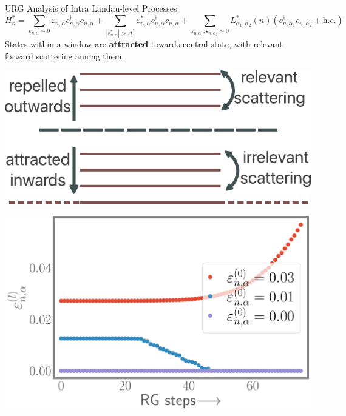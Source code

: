 \documentclass[11pt,aspectratio=169]{beamer}
\newcommand\focus[1]{%
	{\alert{\textbf{#1}}}
}
\begin{document}
\begin{frame}{URG Analysis of Intra Landau-level Processes}
\[
	H_n^* = \sum_{\varepsilon_{n,\alpha} \sim 0}\varepsilon_{n,\alpha} c^\dagger_{n, \alpha} c_{n,\alpha} + \sum_{|\varepsilon^*_{n,\alpha}| > \Delta^*}\varepsilon^*_{n,\alpha}c^\dagger_{n,\alpha} c_{n,\alpha} + \sum_{\varepsilon_{n,\alpha_1}, \varepsilon_{n,\alpha_2} \sim 0}L_{\alpha_1,\alpha_2}^*(n)\left(c^\dagger_{n, \alpha_1}c_{n,\alpha_2} + \text{h.c.}\right)
\]
States within a window are \focus{attracted} towards central state, with relevant forward scattering among them.

\begin{minipage}{0.45\textwidth}
	\includegraphics[width=\textwidth]{intraLL.pdf}
\end{minipage}
\hspace*{\fill}
\begin{minipage}{0.4\textwidth}
	\includegraphics[width=\textwidth]{intraLL_epsRG.pdf}
\end{minipage}
\end{frame}
\end{document}
